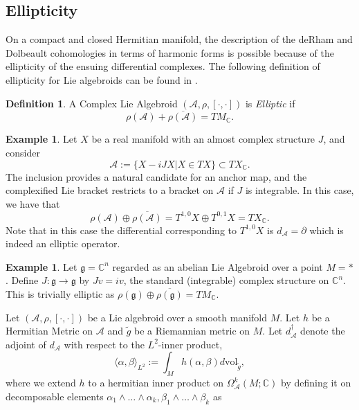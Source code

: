 \documentclass{amsart}
\newcommand{\p}{\partial}
\newcommand{\C}{\mathbb{C}}
\newcommand{\ra}{\rightarrow}
\theoremstyle{definition}
\newtheorem{definition}[theorem]{Definition}
\newcommand{\A}{\mathcal{A}}
\theoremstyle{definition}
\newtheorem{exmp}[theorem]{Example}
\begin{document}
\subsection{Ellipticity} On a compact and
closed Hermitian manifold, the description of the deRham and Dolbeault cohomologies in terms of harmonic forms is possible because of the ellipticity of the ensuing differential complexes. The following definition of ellipticity for Lie algebroids can be found in \cite[Definition 1.15]{MR4377306}.
\begin{definition}
    A Complex Lie Algebroid $(\A, \rho ,[\cdot, \cdot])$ is \textit{Elliptic} if 
    \begin{equation*}
        \rho(\A) + \overline{\rho(\A)} = TM_\C.
    \end{equation*}
\end{definition}
\begin{exmp}
    Let $X$ be a real manifold with an almost complex structure $J$, and consider 
    \begin{equation*}
        \A := \{X-iJX | X \in TX\} \subset TX_\C.
    \end{equation*}
    The inclusion provides a natural candidate for an anchor map, and the complexified Lie bracket restricts to a bracket on $\A$ if $J$ is integrable. In this case, we have that 
    \begin{equation*}
        \rho(\A) \oplus \overline{\rho(\A)} = T^{1,0}X \oplus T^{0,1}X = TX_\C.
    \end{equation*}
    Note that in this case the differential corresponding to $T^{1,0}X$ is $d_\A = \p$ which is indeed an elliptic operator. 
\end{exmp}
\begin{exmp}
    Let $\mathfrak{g}=\C^n$ regarded as an abelian Lie Algebroid over a point $M=*$. Define $J:\mathfrak{g} \ra \mathfrak{g}$ by $Jv=iv$, the standard (integrable) complex structure on $\C^n$. This is trivially elliptic as $\rho(\mathfrak{g}) \oplus \overline{\rho(\mathfrak{g})}=TM_\C$.
\end{exmp}
Let $(\A,\rho, [\cdot,\cdot])$ be a Lie algebroid over a smooth manifold $M$. Let $h$ be a Hermitian Metric on $\A$ and $\tilde{g}$ be a Riemannian metric on $M$. Let $d_\A^\dagger$ denote the adjoint of $d_\A$ with respect to the $L^2$-inner product,
\begin{equation*}
    \langle \alpha, \beta \rangle_{L^2} := \int_M h(\alpha, \beta) d\text{vol}_{\tilde{g}},
\end{equation*}
where we extend $h$ to a hermitian inner product on $\Omega_\A^k(M;\C)$ by defining it on decomposable elements $\alpha_1 \wedge \dots \wedge \alpha_k, \beta_1 \wedge \dots \wedge \beta_k$ as
\end{document}
